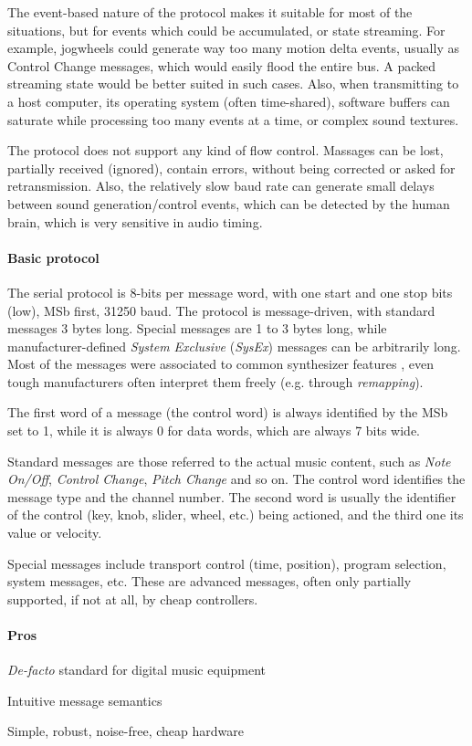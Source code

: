 \documentclass[a4paper,10pt]{article}
\begin{document}
\begin{multicols}{2}
The event-based nature of the protocol makes it suitable for most of the
situations, but for events which could be accumulated, or state streaming.
For example, jogwheels could generate way too many motion delta events, usually
as Control Change messages, which would easily flood the entire bus. A packed
streaming state would be better suited in such cases.
Also, when transmitting to a host computer, its operating system (often
time-shared), software buffers can saturate while processing too many events
at a time, or complex sound textures.

The protocol does not support any kind of flow control. Massages can be lost,
partially received (ignored), contain errors, without being corrected or asked
for retransmission. Also, the relatively slow baud rate can generate small
delays between sound generation/control events, which can be detected by
the human brain, which is very sensitive in audio timing.


\paragraph{Basic protocol}
The serial protocol is 8-bits per message word, with one start and one stop
bits (low), MSb first, 31250 baud. The protocol is message-driven, with
standard messages 3 bytes long. Special messages are 1 to 3 bytes long, while
manufacturer-defined \emph{System Exclusive} (\emph{SysEx}) messages can be
arbitrarily long. Most of the messages were associated to common synthesizer
features \CITEME, even tough manufacturers often interpret them freely
(e.g. through \emph{remapping}).

The first word of a message (the control word) is always identified by the
MSb set to 1, while it is always 0 for data words, which are always 7 bits wide.

Standard messages are those referred to the actual music content, such as
\emph{Note On/Off}, \emph{Control Change}, \emph{Pitch Change} and so on.
The control word identifies the message type and the channel number. The
second word is usually the identifier of the control (key, knob, slider,
wheel, etc.) being actioned, and the third one its value or velocity.

Special messages include transport control (time, position), program selection,
system messages, etc. These are advanced messages, often only partially
supported, if not at all, by cheap controllers.


\paragraph{Pros}
\begin{itemize*}
	\item \emph{De-facto} standard for digital music equipment
	\item Intuitive message semantics
	\item Simple, robust, noise-free, cheap hardware
\end{itemize*}



\end{multicols}
\end{document}
